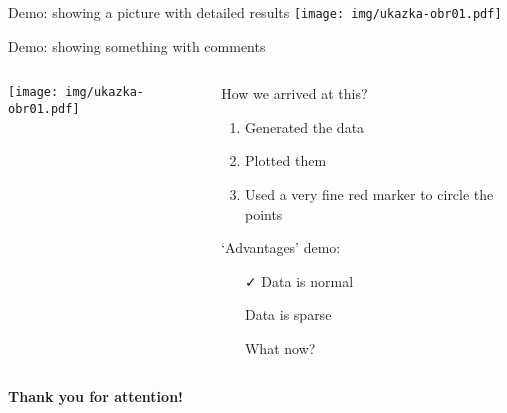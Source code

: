 \documentclass[aspectratio=169]{beamer}
\begin{document}
\begin{frame}{Demo: showing a picture with detailed results}
\centering
\texttt{[image: img/ukazka-obr01.pdf]}
\end{frame}

\begin{frame}{Demo: showing something with comments}
\begin{columns}
\begin{column}{0.5\textwidth}
\texttt{[image: img/ukazka-obr01.pdf]}
\end{column}
\begin{column}{0.5\textwidth}
How we arrived at this?
\begin{enumerate}
\item Generated the data
\item Plotted them
\item Used a very fine red marker to circle the points
\end{enumerate}

`Advantages' demo:

\begin{itemize}
\item[\color{green}\faCheck] Data is normal
\item[\color{red}\faTimes] Data is sparse
\item[\color{violet}\faQuestionCircle] What now?
\end{itemize}
\end{column}
\end{columns}
\end{frame}

\begin{frame}[plain]
\centering
{\Large\bfseries Thank you for attention!}


\end{frame}
\end{document}
